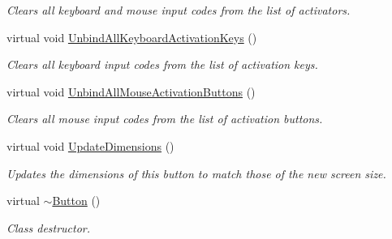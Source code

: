 \begin{DoxyCompactItemize}
\begin{DoxyCompactList}\small\item\em Clears all keyboard and mouse input codes from the list of activators. \item\end{DoxyCompactList}\item 
\hypertarget{classMezzanine_1_1UI_1_1Button_a30c1a1380667e42677b799cfa58c96ee}{
virtual void \hyperlink{classMezzanine_1_1UI_1_1Button_a30c1a1380667e42677b799cfa58c96ee}{UnbindAllKeyboardActivationKeys} ()}
\label{classMezzanine_1_1UI_1_1Button_a30c1a1380667e42677b799cfa58c96ee}

\begin{DoxyCompactList}\small\item\em Clears all keyboard input codes from the list of activation keys. \item\end{DoxyCompactList}\item 
\hypertarget{classMezzanine_1_1UI_1_1Button_a759f6fd2a76b68ef3aae1bb8c2677cf7}{
virtual void \hyperlink{classMezzanine_1_1UI_1_1Button_a759f6fd2a76b68ef3aae1bb8c2677cf7}{UnbindAllMouseActivationButtons} ()}
\label{classMezzanine_1_1UI_1_1Button_a759f6fd2a76b68ef3aae1bb8c2677cf7}

\begin{DoxyCompactList}\small\item\em Clears all mouse input codes from the list of activation buttons. \item\end{DoxyCompactList}\item 
virtual void \hyperlink{classMezzanine_1_1UI_1_1Button_a65764b075c03b2a6eb17039a73a260ce}{UpdateDimensions} ()
\begin{DoxyCompactList}\small\item\em Updates the dimensions of this button to match those of the new screen size. \item\end{DoxyCompactList}\item 
\hypertarget{classMezzanine_1_1UI_1_1Button_a8c84044c337735482919fcc82085cf46}{
virtual \hyperlink{classMezzanine_1_1UI_1_1Button_a8c84044c337735482919fcc82085cf46}{$\sim$Button} ()}
\label{classMezzanine_1_1UI_1_1Button_a8c84044c337735482919fcc82085cf46}

\begin{DoxyCompactList}\small\item\em Class destructor. \item\end{DoxyCompactList}\end{DoxyCompactItemize}
